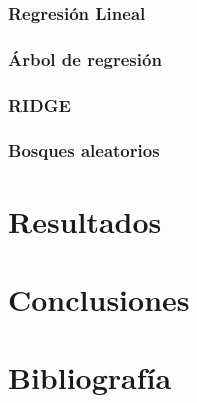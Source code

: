 \documentclass[12pt,a4paper,Spanish]{article}
\begin{document}
\subsubsection{Regresión Lineal}
\subsubsection{Árbol de regresión}
\subsubsection{RIDGE}
\subsubsection{Bosques aleatorios}




\newpage
\section{Resultados}







\newpage
\section{Conclusiones}








\newpage
\section{Bibliografía}
\printbibliography
\end{document}
